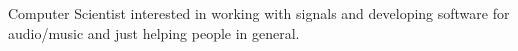 \documentclass[letter,10pt]{article}
\begin{document}


Computer Scientist interested in working with signals and developing software for audio/music and just helping people in general.
\end{document}
